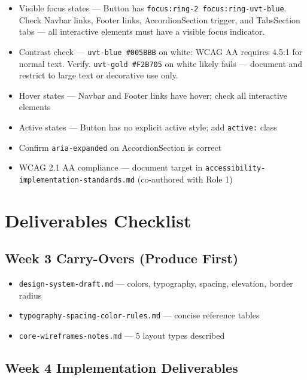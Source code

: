 \documentclass[12pt,a4paper]{article}
\begin{document}
\begin{itemize}
    \item[\faAdjust] Visible focus states --- Button has \texttt{focus:ring-2 focus:ring-uvt-blue}. Check Navbar links, Footer links, AccordionSection trigger, and TabsSection tabs --- all interactive elements must have a visible focus indicator.
    \item[$\square$] Contrast check --- \texttt{uvt-blue \#005BBB} on white: WCAG AA requires 4.5:1 for normal text. Verify. \texttt{uvt-gold \#F2B705} on white likely fails --- document and restrict to large text or decorative use only.
    \item[\faAdjust] Hover states --- Navbar and Footer links have hover; check all interactive elements
    \item[$\square$] Active states --- Button has no explicit active style; add \texttt{active:} class
    \item[$\square$] Confirm \texttt{aria-expanded} on AccordionSection is correct
    \item[$\square$] WCAG 2.1 AA compliance --- document target in \texttt{accessibility-implementation-standards.md} (co-authored with Role 1)
\end{itemize}

\section{Deliverables Checklist}

\subsection{Week 3 Carry-Overs (Produce First)}

\begin{itemize}
    \item[$\square$] \texttt{design-system-draft.md} --- colors, typography, spacing, elevation, border radius
    \item[$\square$] \texttt{typography-spacing-color-rules.md} --- concise reference tables
    \item[$\square$] \texttt{core-wireframes-notes.md} --- 5 layout types described
\end{itemize}

\subsection{Week 4 Implementation Deliverables}
\end{document}
